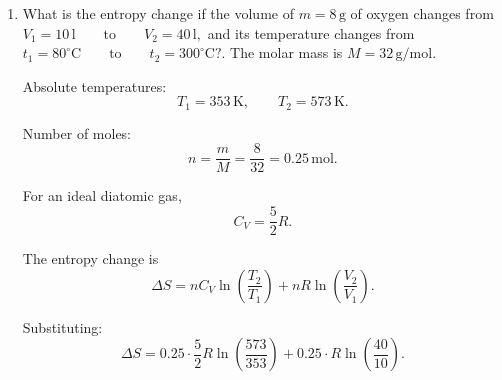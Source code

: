 \documentclass[t,aspectratio=169]{beamer}
\begin{document}
\begin{frame}
\begin{itemize}
\begin{enumerate}
$$\boxed{\Delta S_2 = 3.55\cdot10^4\,J/K}$$








\pagebreak
So,
$$ \boxed{\Delta S_{\mathrm{room}} \approx -2.74\cdot 10^4\,\mathrm{J/K}}$$

Entropy change of the environment:
$$ \Delta S_{\mathrm{env}} = \frac{Q_{\mathrm{hot}}}{T_2}
= \frac{1.0944\cdot 10^7\,J}{308\,K}
= 3.5532\cdot 10^4\,\mathrm{J/K}.$$

So,
$$ \boxed{\Delta S_{\mathrm{env}} \approx 3.55\cdot 10^4\,\mathrm{J/K}}$$

d) Total entropy change

$$\Delta S_{\mathrm{total}} =
\Delta S_{\mathrm{room}} + \Delta S_{\mathrm{env}}$$
$$\Delta S_{\mathrm{total}}
= -2.7429\cdot 10^4\,J/K+ 3.5532\cdot 10^4\,J/K
= 8.1039\cdot 10^3\,\mathrm{J/K}.$$

\pagebreak
$$\boxed{\Delta S_{\mathrm{total}} \approx 8.10\cdot 10^3\,\mathrm{J/K}}$$

$$\Delta S = \Delta S_1 + \Delta S_2
= -27428.57\,J/K+ 35532.47\,J/K
= 8103.90\,J/K.$$

$$\boxed{\Delta S \sim 8\cdot10^33\,J/K}$$


\pagebreak
\item What is the entropy change if the volume of $ m = 8\,\mathrm{g} $ of oxygen changes from $ V_1 = 10\,\mathrm{l} \qquad \text{to} \qquad V_2 = 40\,\mathrm{l},$ and its temperature changes from $t_1 = 80^\circ\mathrm{C} \qquad \text{to} \qquad t_2 = 300^\circ\mathrm{C}?$. The molar mass is $ M = 32\,\mathrm{g/mol}.$
  
\bigskip  
Absolute temperatures:
$$ T_1 = 353\,\mathrm{K}, \qquad T_2 = 573\,\mathrm{K}. $$

Number of moles:
$$ n = \frac{m}{M} = \frac{8}{32} = 0.25\,\mathrm{mol}. $$

\pagebreak
For an ideal diatomic gas,
$$ C_V = \frac{5}{2}R. $$

The entropy change is 
$$\Delta S = n C_V \ln\!\left(\frac{T_2}{T_1}\right)
+ nR \ln\!\left(\frac{V_2}{V_1}\right). $$

Substituting:
$$ \Delta S =
0.25 \cdot \frac{5}{2}R \ln\!\left(\frac{573}{353}\right)
+ 0.25 \cdot R \ln\!\left(\frac{40}{10}\right). $$


\end{enumerate}
\end{itemize}
\end{frame}
\end{document}
